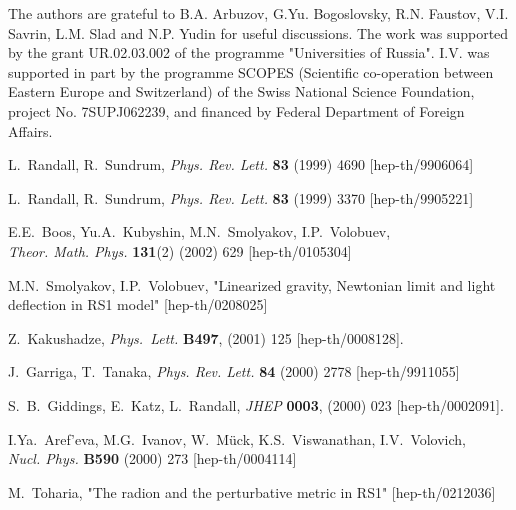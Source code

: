 \documentclass[a4paper,12pt]{article}
\begin{document}
The authors are grateful to B.A. Arbuzov, G.Yu. Bogoslovsky, R.N. Faustov,
V.I. Savrin, L.M. Slad and N.P. Yudin for useful discussions.  The work
was supported by  the grant  UR.02.03.002 of the programme "Universities of
Russia". I.V. was supported in part by the programme SCOPES (Scientific
co-operation between Eastern Europe and Switzerland) of the Swiss National
Science Foundation, project No. 7SUPJ062239, and financed by Federal
Department of Foreign Affairs.

\begin{thebibliography}{99}
L.~Randall, R.~Sundrum, {\em Phys. Rev. Lett.} {\bf 83} (1999)
4690 [hep-th/9906064]

L.~Randall, R.~Sundrum, {\em Phys. Rev. Lett.} {\bf 83} (1999)
3370 [hep-th/9905221]

E.E.~Boos, Yu.A.~Kubyshin, M.N.~Smolyakov, I.P.~Volobuev,\\ {\em
Theor. Math. Phys.} {\bf 131}(2) (2002) 629 [hep-th/0105304]

M.N.~Smolyakov, I.P.~Volobuev, "Linearized gravity, Newtonian
limit and light deflection in RS1 model" [hep-th/0208025]

Z.~Kakushadze,
{\em Phys.\ Lett.} {\bf B497}, (2001) 125 [hep-th/0008128].

J.~Garriga, T.~Tanaka, {\em Phys. Rev. Lett.} {\bf 84} (2000) 2778
[hep-th/9911055]

S.~B.~Giddings, E.~Katz, L.~Randall,
{\em JHEP} {\bf 0003}, (2000) 023 [hep-th/0002091].

I.Ya.~Aref'eva, M.G.~Ivanov, W.~M\"uck,
K.S.~Viswanathan, I.V.~Volovich,\\ {\em Nucl. Phys.} {\bf B590}
(2000) 273 [hep-th/0004114]

M.~Toharia, "The radion and the perturbative metric in RS1"
[hep-th/0212036]

\end{thebibliography}
\end{document}
